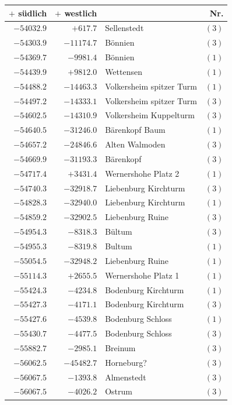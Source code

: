 \begin{center}\begingroup\fontsize{8}{9}\selectfont
\setlength{\tabcolsep}{4pt}
\begin{tabular}{r|r|p{170pt}|r}\hline
\(+\) südlich&\(+\) westlich&&Nr.\\\hline
\(-54032.9\)&\(+617.7\)&Sellenstedt&\((3)\)\\
\(-54303.9\)&\(-11174.7\)&Bönnien&\((3)\)\\
\(-54369.7\)&\(-9981.4\)&Bönnien&\((1)\)\\
\(-54439.9\)&\(+9812.0\)&Wettensen&\((1)\)\\
\(-54488.2\)&\(-14463.3\)&Volkersheim spitzer Turm&\((1)\)\\
\(-54497.2\)&\(-14333.1\)&Volkersheim spitzer Turm&\((3)\)\\
\(-54602.5\)&\(-14310.9\)&Volkersheim Kuppelturm&\((3)\)\\
\(-54640.5\)&\(-31246.0\)&Bärenkopf Baum&\((1)\)\\
\(-54657.2\)&\(-24846.6\)&Alten Walmoden&\((3)\)\\
\(-54669.9\)&\(-31193.3\)&Bärenkopf&\((3)\)\\
\(-54717.4\)&\(+3431.4\)&Wernershohe Platz 2&\((1)\)\\
\(-54740.3\)&\(-32918.7\)&Liebenburg Kirchturm&\((3)\)\\
\(-54828.3\)&\(-32940.0\)&Liebenburg Kirchturm&\((1)\)\\
\(-54859.2\)&\(-32902.5\)&Liebenburg Ruine&\((3)\)\\
\(-54954.3\)&\(-8318.3\)&Bültum&\((3)\)\\
\(-54955.3\)&\(-8319.8\)&Bultum&\((1)\)\\
\(-55054.5\)&\(-32948.2\)&Liebenburg Ruine&\((1)\)\\
\(-55114.3\)&\(+2655.5\)&Wernershohe Platz 1&\((1)\)\\
\(-55424.3\)&\(-4234.8\)&Bodenburg Kirchturm&\((1)\)\\
\(-55427.3\)&\(-4171.1\)&Bodenburg Kirchturm&\((3)\)\\
\(-55427.6\)&\(-4539.8\)&Bodenburg Schloss&\((1)\)\\
\(-55430.7\)&\(-4477.5\)&Bodenburg Schloss&\((3)\)\\
\(-55882.7\)&\(-2985.1\)&Breinum&\((3)\)\\
\(-56062.5\)&\(-45482.7\)&Horneburg?&\((3)\)\\
\(-56067.5\)&\(-1393.8\)&Almenstedt&\((3)\)\\
\(-56067.5\)&\(-4026.2\)&Ostrum&\((3)\)\\

\end{tabular}
\end{center}
